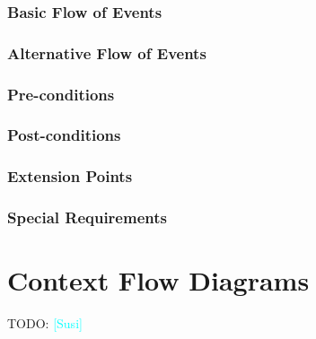 \documentclass{article}
\newcommand{\susi}{\textcolor{cyan}{[Susi]}}
\begin{document}
\subsubsection{Basic Flow of Events}

\subsubsection{Alternative Flow of Events}

\subsubsection{Pre-conditions}

\subsubsection{Post-conditions}

\subsubsection{Extension Points}

\subsubsection{Special Requirements}

\section{Context Flow Diagrams}
TODO: \susi
\end{document}
